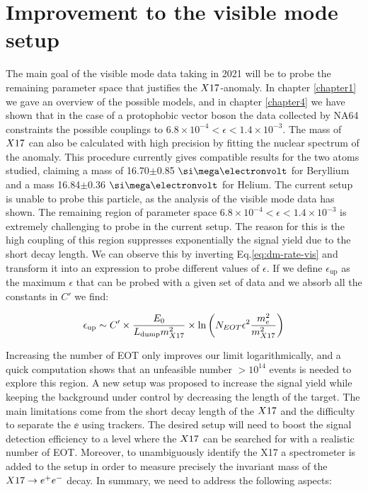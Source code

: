 \section{Improvement to the visible mode setup}
\label{ch5:sec:new-vismode-setup}

The main goal of the visible mode data taking in 2021 will be to probe the remaining parameter space that justifies the $X17$-anomaly. In chapter \ref{chapter1} we gave an overview of the possible models, and in chapter \ref{chapter4} we have shown that in the case of a protophobic vector boson the data collected by NA64 constraints the possible couplings to $6.8 \times 10^{-4} < \epsilon < 1.4 \times 10^{-3}$. The mass of $X17$ can also be calculated with high precision by fitting the nuclear spectrum of the anomaly. This procedure currently gives compatible results for the two atoms studied, claiming a mass of 16.70$\pm$0.85 $\mev$ for Beryllium and a mass 16.84$\pm$0.36 $\mev$ for Helium. The current setup is unable to probe this particle, as the analysis of the visible mode data has shown. The remaining region of parameter space $6.8 \times 10^{-4} < \epsilon < 1.4 \times 10^{-3}$ is extremely challenging to probe in the current setup. The reason for this is the high coupling of this region suppresses exponentially the signal yield due to the short decay length. We can observe this by inverting Eq.\ref{eq:dm-rate-vis} and transform it into an expression to probe different values of $\epsilon$. If we define $\epsilon_{\textrm{up}}$ as the maximum $\epsilon$ that can be probed with a given set of data and we absorb all the constants in $C'$ we find:

\begin{equation}
  \label{eq:x17-coverage}
  \epsilon_{\textrm{up}} \sim C' \times \frac{E_0}{L_{\textrm{dump}}m^2_{X17}} \times \ln{\left(N_{EOT} \epsilon^2 \frac{m_e^2}{m_{X17}^2}\right)}
\end{equation}

Increasing the number of EOT only improves our limit logarithmically, and a quick computation shows that an unfeasible number $>10^{14}$ events is needed to explore this region. A new setup was proposed to increase the signal yield while keeping the background under control by decreasing the length of the target. The main limitations come from the short decay length of the $X17$ and the difficulty to separate the $\ee$ using trackers. The desired setup will need to boost the signal detection efficiency to a level where the $X17$ can be searched for with a realistic number of EOT. Moreover, to unambiguously identify the X17 a spectrometer is added to the setup in order to measure precisely the invariant mass of the $X17 \rightarrow e^+ e^-$ decay. In summary, we need to address the following aspects:

